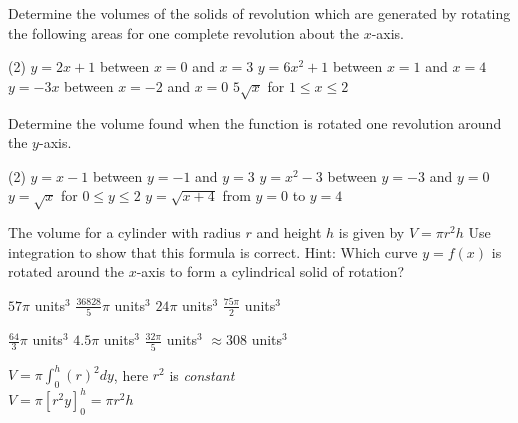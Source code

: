 \begin{Exercise}[title={Volume},label=exVolume]
	\Question Determine the volumes of the solids of revolution which are generated by rotating the following areas for one complete revolution about the $x$-axis.
	\begin{tasks}(2)
		\task  $y=2x+1$ between $x=0$ and $x=3$ %
		\task  $y=6x^2+1$ between $x=1$ and $x=4$ %
		\task $y=-3x$ between $x=-2$ and $x=0$ %
		\task $5\sqrt{x}$ for $1\leq x\leq 2$ %
	\end{tasks}
	
	\Question Determine the volume found when the function is rotated one revolution around the $y$-axis.
	\begin{tasks}(2)
		\task $y=x-1$ between $y=-1$ and $y=3$ %
		\task $y=x^2-3$ between $y=-3$ and $y=0$ %
		\task $y=\sqrt{x}$ for $0\leq y\leq 2$ %
		\task $y=\sqrt{x+4}$ from $y=0$ to $y=4$ %
	\end{tasks}
\Question The volume for a cylinder with radius $r$ and height $h$ is given by $V=\pi r^2h$ Use integration to show that this formula is correct. Hint: Which curve $y=f(x)$ is rotated around the $x$-axis to form a cylindrical solid of rotation?

\end{Exercise}
\begin{Answer}[ref={exVolume}]
		\Question %
	\begin{tasks}
		\task $57\pi$ units$^3$
		\task $\frac{36828}{5}\pi$ units$^3$
		\task $24\pi$ units$^3$
		\task $\frac{75\pi}{2}$ units$^3$
	\end{tasks}
	
	\Question %
	\begin{tasks}
		\task $\frac{64}{3}\pi$ units$^3$
		\task $4.5\pi$ units$^3$
		\task $\frac{32\pi}{5}$ units$^3$
		\task $\approx 308$ units$^3$
	\end{tasks}
\Question %
$V=\pi\int_0^h (r)^2 dy$, here $r^2$ is \textit{constant}\\
$V=\pi[r^2 y]_0^h=\pi r^2 h$
\end{Answer}%

